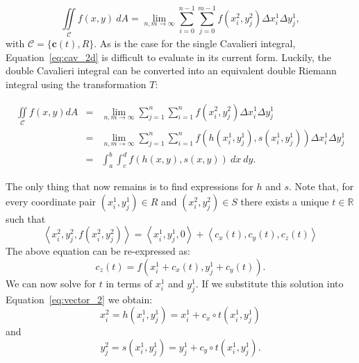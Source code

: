 \documentclass{article}
\theoremstyle{theorem}
\theoremstyle{definition}
\begin{document}
\begin{equation}
\label{eq:cav_2d}
\iint \limits_{\mathcal{C}} f(x,y)~dA = \lim_{n,m \rightarrow \infty}  \sum_{i=0}^{n-1} \sum_{j=0}^{m-1} f(x_i^2,y_j^2) \Delta x_i^1 \Delta y_j^1,
\end{equation}
with $\mathcal{C} = \{\mathbf{c}(t),R\}$. As is the case for the single Cavalieri integral, Equation~\eqref{eq:cav_2d} is difficult to evaluate in its current form. Luckily, the double 
Cavalieri integral can be converted into an equivalent double Riemann integral using the transformation $T$:

\begin{eqnarray}
\iint\limits_{\!\mathcal{C}} f(x,y) dA &=& \lim_{n,m\rightarrow \infty} \sum_{j=1}^n\sum_{i=1}^n f(x_i^2,y_j^2) \Delta x_i^1\Delta y_j^1\nonumber\\
&=&  \lim_{n,m\rightarrow \infty} \sum_{j=1}^n\sum_{i=1}^n f(h(x_i^1,y_j^1),s(x_i^1,y_j^1)) \Delta x_i^1\Delta y_j^1\nonumber\\
&=& \int_a^b\int_c^d f(h(x,y),s(x,y))~dx~dy.\nonumber
\end{eqnarray}

\noindent
The only thing that now remains is to find expressions for $h$ and $s$. Note that, for every coordinate pair $(x_i^1,y_j^1)\in R$ and $(x_i^2,y_j^2)\in S$ there exists a unique $t\in \mathbb{R}$ such that 
\begin{equation}
\label{eq:vector_2}
\left< x_i^2, y_j^2, f(x_i^2,y_j^2) \right > = \left < x_i^1, y_j^1, 0 \right > + \left <c_x(t),c_y(t),c_z(t)\right >  
\end{equation}
The above equation can be re-expressed as:
\begin{equation}
\label{eq:c_z}
c_z(t) = f(x_i^1 + c_x(t),y_j^1 + c_y(t)). 
\end{equation}
We can now solve for $t$ in terms of $x_i^1$ and $y_j^1$. If we substitute this solution into Equation~\eqref{eq:vector_2} we obtain:
\begin{equation}
\label{eq:h_2d}
x_i^2 = h(x_i^1,y_j^1) = x_i^1 + c_x\circ t(x_i^1,y_j^1) 
\end{equation}
and 
\begin{equation}
\label{eq:s_2d}
y_j^2 = s(x_i^1,y_j^1) = y_j^1 + c_y\circ t(x_i^1,y_j^1). 
\end{equation}
\end{document}
